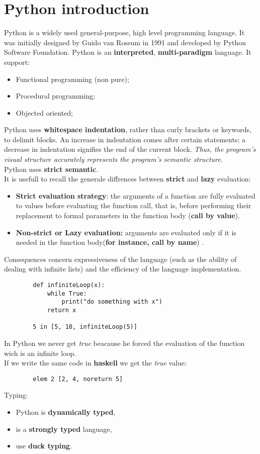 \documentclass[12pt]{article}
\begin{document}
\section{Python introduction}
	Python is a widely used general-purpose, high level programming language. It was initially designed by Guido van Rossum in 1991 and developed by Python Software Foundation. Python is an \textbf{interpreted}, \textbf{multi-paradigm} language. It support:
	\begin{itemize}
		\item Functional programming (non pure);
		\item Procedural programming;
		\item Objected oriented;
	\end{itemize} 
	Python uses \textbf{whitespace indentation}, rather than curly brackets or keywords, to delimit blocks. An increase in indentation comes after certain statements; a decrease in indentation signifies the end of the current block. \textit{Thus, the program's visual structure accurately represents the program's semantic structure}.\\
	Python uses \textbf{strict semantic}. \\
	It is usefull to recall the generale diffrences between \textbf{strict} and \textbf{lazy} evaluation:
	\begin{itemize}
		\item \textbf{Strict evaluation strategy}: the arguments of a function are fully evaluated to values before evaluating the function call, that is, before performing their replacement to formal parameters in the function body (\textbf{call by
		value}).
		\item \textbf{Non-strict or Lazy evaluation:} arguments are evaluated only if it is needed
		in the function body(\textbf{for instance, call by name}) .
	\end{itemize}
	Consequences concern expressiveness of the language (such as the ability of
	dealing with infinite lists) and the efficiency of the language implementation.
	\begin{lstlisting}
		def infiniteLoop(x):
			while True:
				print("do something with x")
			return x
		
		5 in [5, 10, infiniteLoop(5)]
	\end{lstlisting}
	In Python we never get \textit{true} beacause  he forced the evaluation of the function wich is an infinite loop.\\
	If we write the same code in \textbf{haskell} we get the \textit{true} value:
	\begin{lstlisting}
		elem 2 [2, 4, noreturn 5]
	\end{lstlisting}
	Typing:
	\begin{itemize}
		\item Python is \textbf{ dynamically typed},
		\item is a \textbf{strongly typed} language,
		\item use \textbf{duck typing}.
	\end{itemize}
\end{document}
